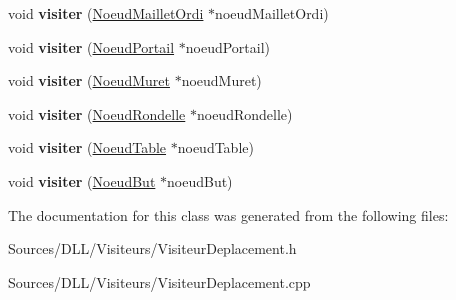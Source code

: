 \begin{DoxyCompactItemize}
\item 
void {\bfseries visiter} (\hyperlink{class_noeud_maillet_ordi}{Noeud\+Maillet\+Ordi} $\ast$noeud\+Maillet\+Ordi)\hypertarget{class_visiteur_deplacement_a293a3a85b4e72f024231fd6a09fc79bf}{}\label{class_visiteur_deplacement_a293a3a85b4e72f024231fd6a09fc79bf}

\item 
void {\bfseries visiter} (\hyperlink{class_noeud_portail}{Noeud\+Portail} $\ast$noeud\+Portail)\hypertarget{class_visiteur_deplacement_a2f570edd51ab45f4f27e21c7243694ff}{}\label{class_visiteur_deplacement_a2f570edd51ab45f4f27e21c7243694ff}

\item 
void {\bfseries visiter} (\hyperlink{class_noeud_muret}{Noeud\+Muret} $\ast$noeud\+Muret)\hypertarget{class_visiteur_deplacement_a04fa5d9f88126b74ed736c6fc4979eba}{}\label{class_visiteur_deplacement_a04fa5d9f88126b74ed736c6fc4979eba}

\item 
void {\bfseries visiter} (\hyperlink{class_noeud_rondelle}{Noeud\+Rondelle} $\ast$noeud\+Rondelle)\hypertarget{class_visiteur_deplacement_ab9d2dace6c4b1cec16bda1d2c73982d7}{}\label{class_visiteur_deplacement_ab9d2dace6c4b1cec16bda1d2c73982d7}

\item 
void {\bfseries visiter} (\hyperlink{class_noeud_table}{Noeud\+Table} $\ast$noeud\+Table)\hypertarget{class_visiteur_deplacement_a6b7717f41c77826356cdb6cb5e0797bc}{}\label{class_visiteur_deplacement_a6b7717f41c77826356cdb6cb5e0797bc}

\item 
void {\bfseries visiter} (\hyperlink{class_noeud_but}{Noeud\+But} $\ast$noeud\+But)\hypertarget{class_visiteur_deplacement_a9127d3a25d6c63b648356f10309df8e1}{}\label{class_visiteur_deplacement_a9127d3a25d6c63b648356f10309df8e1}

\end{DoxyCompactItemize}


The documentation for this class was generated from the following files\+:\begin{DoxyCompactItemize}
\item 
Sources/\+D\+L\+L/\+Visiteurs/Visiteur\+Deplacement.\+h\item 
Sources/\+D\+L\+L/\+Visiteurs/Visiteur\+Deplacement.\+cpp\end{DoxyCompactItemize}
